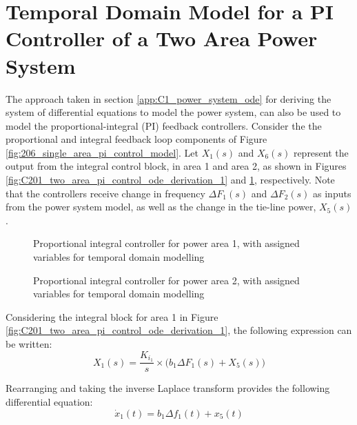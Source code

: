 \section{Temporal Domain Model for a PI Controller of a Two Area Power System}

The approach taken in section \ref{app:C1_power_system_ode} for deriving the system of differential equations to model the power system, can also be used to model the proportional-integral (PI) feedback controllers. Consider the the proportional and integral feedback loop components of Figure \ref{fig:206_single_area_pi_control_model}. Let $X_1(s)$ and $X_6(s)$ represent the output from the integral control block, in area 1 and area 2, as shown in Figures \ref{fig:C201_two_area_pi_control_ode_derivation_1} and \ref{fig:C202_two_area_pi_control_ode_derivation_2}, respectively. Note that the controllers receive change in frequency $\Delta F_1(s)$ and $\Delta F_2(s)$ as inputs from the power system model, as well as the change in the tie-line power, $X_5(s)$.

\begin{figure}[h]
	\begin{minipage}[b]{0.5\textwidth}
		\resizebox{7.0cm}{!}{}
		\caption{Proportional integral controller for power area 1, with assigned variables for temporal domain modelling}
		\label{fig:C201_two_area_pi_control_ode_derivation_1}
	\end{minipage}
	\hspace{0.1cm}
	\begin{minipage}[b]{0.5\textwidth}
		\resizebox{7.2cm}{!}{}
		\caption{Proportional integral controller for power area 2, with assigned variables for temporal domain modelling}
		\label{fig:C202_two_area_pi_control_ode_derivation_2}
	\end{minipage}
\end{figure}

Considering the integral block for area 1 in Figure \ref{fig:C201_two_area_pi_control_ode_derivation_1}, the following expression can be written:
\begin{equation}
	X_1(s) = \frac{K_{i_1}}{s} \times \big( b_1 \Delta F_1(s) + X_5(s) \big) \label{eq:C201}
\end{equation}

Rearranging and taking the inverse Laplace transform provides the following differential equation:
\begin{equation}
	\dot{x}_1(t) = b_1 \Delta f_1(t) + x_5(t) \label{eq:C202}
\end{equation}

